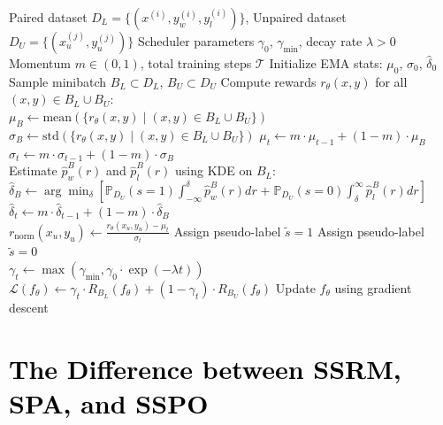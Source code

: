 \documentclass{article} %
\newcommand\rebuttal[1]{\textcolor{black}{#1}}
\begin{document}
\begin{algorithm}[t]
\caption{\textbf{S}emi-\textbf{S}upervised \textbf{P}reference \textbf{O}ptimization (\textbf{SSPO})}
\label{alg:sspo}
\begin{algorithmic}[1]
\REQUIRE Paired dataset $D_L = \{(x^{(i)}, y_{w}^{(i)}, y_{l}^{(i)})\}$, Unpaired dataset $D_U = \{(x_u^{(j)}, y_u^{(j)})\}$
\REQUIRE Scheduler parameters $\gamma_0$, $\gamma_{\min}$, decay rate $\lambda > 0$
\REQUIRE Momentum $m \in (0, 1)$, total training steps $\mathcal{T}$
\STATE Initialize EMA stats: $\mu_0$, $\sigma_0$, $\hat{\delta}_0$
\\[0.5em]
   \STATE Sample minibatch $B_L \subset D_L$, $B_U \subset D_U$
   \STATE Compute rewards $r_\theta(x, y)$ for all $(x, y) \in B_L \cup B_U$:
   \\[0.3em]
       \STATE \qquad $\mu_B \gets \mathrm{mean}(\{r_\theta(x, y) \mid (x, y) \in B_L \cup B_U\})$
       \STATE \qquad $\sigma_B \gets \mathrm{std}(\{r_\theta(x, y) \mid (x, y) \in B_L \cup B_U\})$
       \STATE \qquad $\mu_t \gets m \cdot \mu_{t-1} + (1 - m) \cdot \mu_B$
       \STATE \qquad $\sigma_t \gets m \cdot \sigma_{t-1} + (1 - m) \cdot \sigma_B$
   \\[0.3em]
   \STATE Estimate $\hat{p}_w^B(r)$ and $\hat{p}_l^B(r)$ using KDE on $B_L$:
       \STATE \qquad $\hat{\delta}_B \gets \arg\min_{\delta} \left[ \mathbb{P}_{D_U}(s = 1) \int_{-\infty}^{\delta} \hat{p}_w^B(r) dr \right.\;\left. +\; \mathbb{P}_{D_U}(s = 0) \int_{\delta}^{\infty} \hat{p}_l^B(r) dr \right]$
       \STATE \qquad $\hat{\delta}_t \gets m \cdot \hat{\delta}_{t-1} + (1 - m) \cdot \hat{\delta}_B$
   \\[0.3em]
       \STATE $r_{\mathrm{norm}}(x_u, y_u) \gets \frac{r_\theta(x_u, y_u) - \mu_t}{\sigma_t}$
           \STATE Assign pseudo-label $\tilde{s} = 1$
       \ELSE
           \STATE Assign pseudo-label $\tilde{s} = 0$
       \ENDIF
   \ENDFOR
   \\[0.3em]
   \STATE $\gamma_t \gets \max(\gamma_{\min}, \gamma_0 \cdot \exp(-\lambda t))$
   \STATE $\mathcal{L}(f_\theta) \gets \gamma_t \cdot R_{B_L}(f_\theta) + (1 - \gamma_t) \cdot R_{B_U}(f_\theta)$
   \STATE Update $f_\theta$ using gradient descent
\ENDFOR
\end{algorithmic}
\end{algorithm}

\section{\rebuttal{The Difference between SSRM, SPA, and SSPO}}
\end{document}
